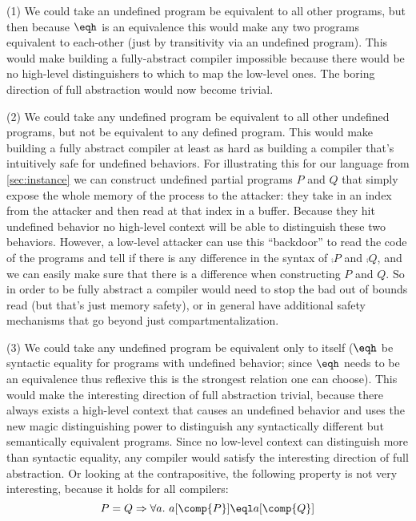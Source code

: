\documentclass[10pt, conference, compsocconf, letterpaper, times]{IEEEtran}
\begin{document}
(1) We could take an undefined program be equivalent to all other
programs, but then because $\eqh$ is an equivalence this would make
any two programs equivalent to each-other (just by transitivity
via an undefined program). This would make building a fully-abstract
compiler impossible because there would be no high-level distinguishers
to which to map the low-level ones. The boring direction of full
abstraction would now become trivial.

(2) We could take any undefined program be equivalent to all other
undefined programs, but not be equivalent to any defined program.
This would make building a fully abstract compiler at least as hard as building
a compiler that's intuitively safe for undefined behaviors. For
illustrating this for our language from \autoref{sec:instance} we can
construct undefined partial programs $P$ and $Q$ that simply expose
the whole memory of the process to the attacker: they take in an index
from the attacker and then read at that index in a buffer. Because
they hit undefined behavior no high-level context will be able to
distinguish these two behaviors. However, a low-level attacker can use
this ``backdoor'' to read the code of the programs and tell if there
is any difference in the syntax of $\comp{P}$ and $\comp{Q}$, and we
can easily make sure that there is a difference when constructing $P$
and $Q$. So in order to be fully abstract a compiler would need to
stop the bad out of bounds read (but that's just memory safety), or in
general have additional safety mechanisms that go beyond just
compartmentalization.

(3) We could take any undefined program be equivalent only to itself
(\IE $\eqh$ be syntactic equality for programs with undefined
behavior; since $\eqh$ needs to be an equivalence thus reflexive this is the
strongest relation one can choose). This would make the interesting
direction of full abstraction trivial, because there always exists a
high-level context that causes an undefined behavior and uses the new
magic distinguishing power to distinguish any syntactically different but
semantically equivalent programs. Since no low-level context can
distinguish more than syntactic equality, any compiler would satisfy
the interesting direction of full abstraction. Or looking at the
contrapositive, the following property is not very interesting,
because it holds for all compilers:
\[
P = Q \Rightarrow \forall a.~ a[\comp{P}] \eql a[\comp{Q}]
\]
\end{document}
